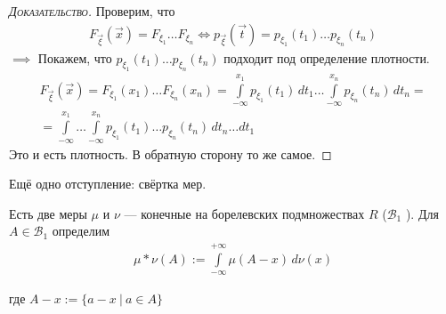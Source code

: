 \begin{proof}[\normalfont\textsc{Доказательство}]
 Проверим, что
 \begin{align*}
  F_{\vec\xi}(\vec x) = F_{\xi_1} \ldots F_{\xi_n} \iff p_{\vec\xi}(\vec t) = p_{\xi_1}(t_1) \ldots p_{\xi_n}(t_n)
 \end{align*}
 $ \implies $ Покажем, что $ p_{\xi_1}(t_1) \ldots p_{\xi_n}(t_n) $ подходит под определение плотности.
 \begin{align*}
  F_{\vec\xi}(\vec x) = F_{\xi_1}(x_1) \ldots F_{\xi_n}(x_n) = \int\limits_{-\infty}^{x_1} p_{\xi_1}(t_1)\,dt_1 \ldots \int\limits_{-\infty}^{x_n} p_{\xi_n}(t_n)\,dt_n = \\
  = \int\limits_{-\infty}^{x_1} \ldots \int\limits_{-\infty}^{x_n} p_{\xi_1}(t_1) \ldots p_{\xi_n}(t_n)\,dt_n\ldots dt_1
 \end{align*} Это и есть плотность. В обратную сторону то же самое.
\end{proof}

Ещё одно отступление: свёртка мер.

Есть две меры $ \mu $ и $ \nu $ --- конечные на борелевских подмножествах $ R $ ($ \mathcal B_1 $ ). Для $ A \in \mathcal B_1 $ определим
 \begin{align*}
 \mu \ast \nu(A) := \int\limits_{-\infty}^{+\infty} \mu(A-x)\,d\nu(x)
\end{align*}

где $A - x := \{ a - x \ \vert \ a \in A \}$


